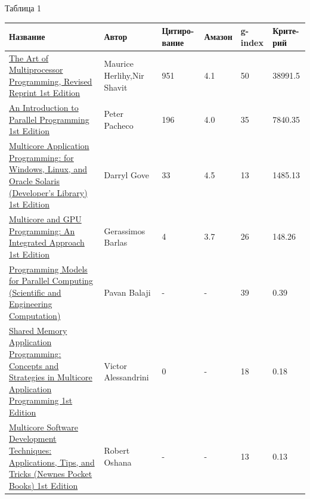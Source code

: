 \documentclass{article}
\begin{document}
			\begin{flushleft}
				\hypertarget{table1}{Таблица 1}
				\begin{longtable}{|p{6cm}|p{2.4cm}|p{1.6cm}|p{1.55cm}|p{1.55cm}|p{1.7cm}|}
\hline
Название & Автор & Цитиро-вание & Амазон & g-index & Крите-рий \\\hline

\href{http://www.amazon.com/The-Multiprocessor-Programming-Revised-Reprint/dp/0123973376}{The Art of Multiprocessor Programming, Revised Reprint 1st Edition} & 
Maurice Herlihy,\newline Nir Shavit & 951 & 4.1 & 50 & 38991.5 \\\hline

\href{http://www.amazon.com/Introduction-Parallel-Programming-Peter-Pacheco/dp/0123742609}{An Introduction to Parallel Programming 1st Edition} &
Peter Pacheco & 196 & 4.0 & 35 & 7840.35 \\\hline

\href{http://www.amazon.com/Multicore-Application-Programming-Windows-Developers/dp/0321711378}{Multicore Application Programming: for Windows, Linux, and Oracle Solaris (Developer's Library) 1st Edition} &
Darryl Gove & 33 & 4.5 & 13 & 1485.13 \\\hline

\href{http://www.amazon.com/Multicore-GPU-Programming-Integrated-Approach/dp/0124171370}{Multicore and GPU Programming: An Integrated Approach 1st Edition} &
Gerassimos Barlas & 4 & 3.7 & 26 & 148.26 \\\hline

\href{http://www.amazon.com/Programming-Computing-Scientific-Engineering-Computation/dp/0262528819}{Programming Models for Parallel Computing (Scientific and Engineering Computation)} &
Pavan Balaji & - & - & 39 & 0.39 \\\hline

\href{http://www.amazon.com/Shared-Memory-Application-Programming-Strategies/dp/012803761X}{Shared Memory Application Programming: Concepts and Strategies in Multicore Application Programming 1st Edition} &
Victor Alessandrini & 0 & - & 18 & 0.18 \\\hline

\href{http://www.amazon.com/Multicore-Software-Development-Techniques-Applications/dp/0128009586}{Multicore Software Development Techniques: Applications, Tips, and Tricks (Newnes Pocket Books) 1st Edition} &
Robert Oshana & - & - & 13 & 0.13 \\\hline
				\end{longtable}
			

\end{flushleft}
\end{document}
